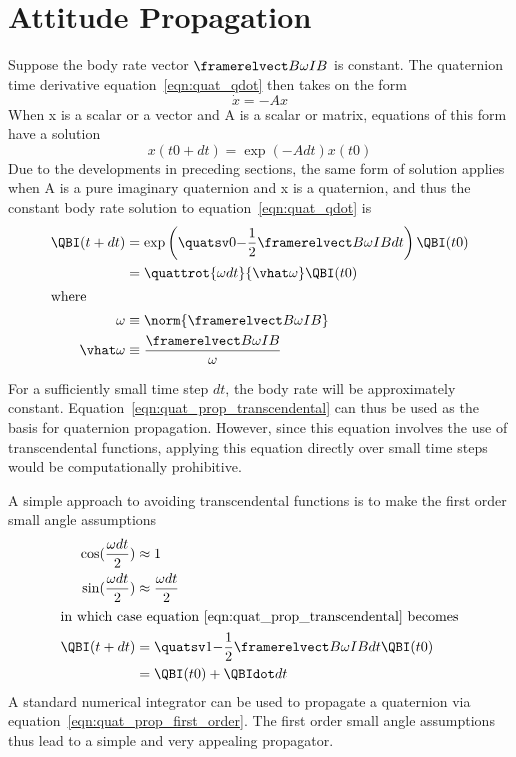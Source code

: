 \section{Attitude Propagation}\label{sec:app_att_prop}


Suppose the body rate vector $\framerelvect B \omega I B$ is constant.
The quaternion time derivative equation~\eqref{eqn:quat_qdot} then takes on the form
\begin{equation}
  \dot{x} = -A x
\end{equation}
When x is a scalar or a vector and A is a scalar or matrix,
equations of this form have a solution
\begin{equation}
  x(t0+dt) = \exp(-A dt) x(t0)
\end{equation}
Due to the developments in preceding sections, the
same form of solution applies when A is a pure imaginary quaternion
and x is a quaternion, and thus the constant body rate solution
to equation~\eqref{eqn:quat_qdot} is
\begin{align}
  \QBI(t+dt) &= \exp\left(\quatsv 0 {-\frac{1}{2} {\framerelvect B \omega I B} dt}\right) \QBI(t0) \nonumber \\
  &= \quattrot {\omega dt}{\vhat \omega}\QBI(t0) \label{eqn:quat_prop_transcendental} \\
\intertext{where}
  \omega &\equiv \norm {\framerelvect B \omega I B} \nonumber \\
  \vhat \omega &\equiv \frac {\framerelvect B \omega I B} \omega \nonumber
\end{align}

For a sufficiently small time step $dt$, the body rate will be approximately constant.
Equation~\eqref{eqn:quat_prop_transcendental} can thus be used as the basis for
quaternion propagation. However, since this equation involves the use of
transcendental functions, applying this equation directly over small time steps would be
computationally prohibitive.

A simple approach to avoiding transcendental functions is to make the
first order small angle assumptions
\begin{align}
  \cos(\frac{\omega dt} 2) &\approx 1 \\
  \sin(\frac{\omega dt} 2) &\approx \frac{\omega dt} 2 \\
\intertext{in which case equation~\eqref{eqn:quat_prop_transcendental} becomes}
  \QBI(t+dt) &= \quatsv 1 {- \frac 1 2  {\framerelvect B \omega I B} dt} \QBI(t0) \nonumber \\
  &= \QBI(t0) + \QBIdot dt \label{eqn:quat_prop_first_order}
\end{align}
A standard numerical integrator can be used to propagate a quaternion via
equation~\eqref{eqn:quat_prop_first_order}.
The first order small angle assumptions thus lead to a simple and very appealing propagator.

